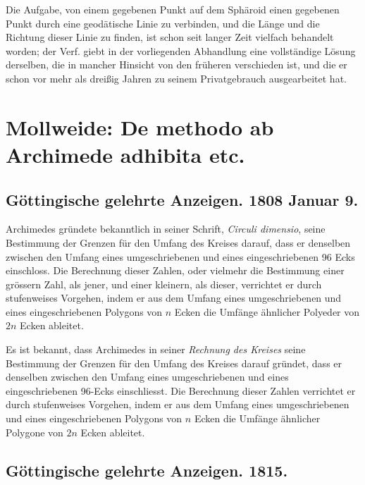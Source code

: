 \documentclass[fontsize=10pt,paper=a5,pagesize,headings=small,headinclude=true,footinclude=true]{scrbook}
\begin{document}
Die Aufgabe, von einem gegebenen Punkt auf dem Sphäroid einen gegebenen Punkt durch eine geodätische Linie zu verbinden, und die Länge und die Richtung dieser Linie zu finden, ist schon seit langer Zeit vielfach behandelt worden; der Verf. giebt in der vorliegenden Abhandlung eine vollständige Lösung derselben, die in mancher Hinsicht von den früheren verschieden ist, und die er schon vor mehr als dreißig Jahren zu seinem Privatgebrauch ausgearbeitet hat.


\newpage
\section*{Mollweide: De methodo ab Archimede adhibita etc.}

\subsection*{Göttingische gelehrte Anzeigen. 1808 Januar 9.}

Archimedes gründete bekanntlich in seiner Schrift, \textit{Circuli dimensio}, seine Bestimmung der Grenzen für den Umfang des Kreises darauf, dass er denselben zwischen den Umfang eines umgeschriebenen und eines eingeschriebenen 96 Ecks einschloss. Die Berechnung dieser Zahlen, oder vielmehr die Bestimmung einer grössern Zahl, als jener, und einer kleinern, als dieser, verrichtet er durch stufenweises Vorgehen, indem er aus dem Umfang eines umgeschriebenen und eines eingeschriebenen Polygons von $n$ Ecken die Umfänge ähnlicher Polyeder von $2n$ Ecken ableitet.

Es ist bekannt, dass Archimedes in seiner \textit{Rechnung des Kreises} seine Bestimmung der Grenzen für den Umfang des Kreises darauf gründet, dass er denselben zwischen den Umfang eines umgeschriebenen und eines eingeschriebenen 96-Ecks einschliesst. Die Berechnung dieser Zahlen verrichtet er durch stufenweises Vorgehen, indem er aus dem Umfang eines umgeschriebenen und eines eingeschriebenen Polygons von $n$ Ecken die Umfänge ähnlicher Polygone von $2n$ Ecken ableitet.

\subsection*{Göttingische gelehrte Anzeigen. 1815.}
\end{document}
